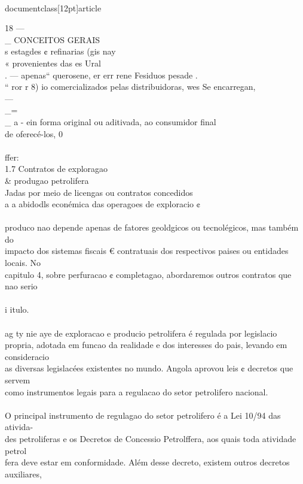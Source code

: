 \\documentclass[12pt]{article}
\begin{document}
{18 —\\_ CONCEITOS GERAIS\\
s estagdes ¢ refinarias (gis nay\\
« provenientes das es Ural\\
. — apenas“ querosene, er err rene Fesiduos pesade .\\
“ ror r 8) io comercializados pelas distribuidoras, wes Se encarregan,\\
—\\_= \\_ a - ein forma original ou aditivada, ao consumidor final\\
de oferecé-los, 0\\
\\
ffer:\\
1.7 Contratos de exploragao \\& produgao petrolifera\\
Jadas por meio de licengas ou contratos concedidos\\
a a abidodls econémica das operagoes de exploracio ¢\\
\\
produco nao depende apenas de fatores geoldgicos ou tecnolégicos, mas também do\\
impacto dos sistemas fiscais € contratuais dos respectivos paises ou entidades locais. No\\
capitulo 4, sobre perfuracao ¢ completagao, abordaremos outros contratos que nao serio\\
\\
i itulo.\\
\\
ag ty nie aye de exploracao e producio petrolifera é regulada por legislacio\\
propria, adotada em funcao da realidade e dos interesses do pais, levando em consideracio\\
as diversas legislacées existentes no mundo. Angola aprovou leis ¢ decretos que servem\\
como instrumentos legais para a regulacao do setor petrolifero nacional.\\
\\
O principal instrumento de regulagao do setor petrolifero é a Lei 10/94 das ativida-\\
des petroliferas e os Decretos de Concessio Petrolffera, aos quais toda atividade petrol\\
fera deve estar em conformidade. Além desse decreto, existem outros decretos auxiliares,\\
}
\end{document}
